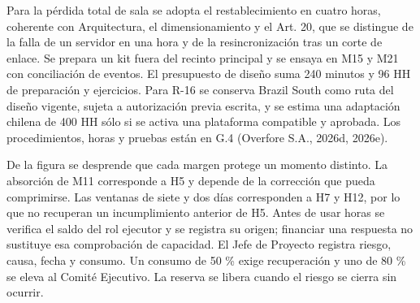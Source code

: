 \documentclass[subdoc]{../../comun/overfore}
\begin{document}
Para la pérdida total de sala se adopta el restablecimiento en cuatro horas, coherente con Arquitectura, el dimensionamiento y el Art. 20, que se distingue de la falla de un servidor en una hora y de la resincronización tras un corte de enlace. Se prepara un kit fuera del recinto principal y se ensaya en M15 y M21 con conciliación de eventos. El presupuesto de diseño suma 240 minutos y 96 HH de preparación y ejercicios. Para R-16 se conserva Brazil South como ruta del diseño vigente, sujeta a autorización previa escrita, y se estima una adaptación chilena de 400 HH sólo si se activa una plataforma compatible y aprobada. Los procedimientos, horas y pruebas están en G.4 (Overfore S.A., 2026d, 2026e).

De la figura se desprende que cada margen protege un momento distinto. La absorción de M11 corresponde a H5 y depende de la corrección que pueda comprimirse. Las ventanas de siete y dos días corresponden a H7 y H12, por lo que no recuperan un incumplimiento anterior de H5. Antes de usar horas se verifica el saldo del rol ejecutor y se registra su origen; financiar una respuesta no sustituye esa comprobación de capacidad. El Jefe de Proyecto registra riesgo, causa, fecha y consumo. Un consumo de 50 \% exige recuperación y uno de 80 \% se eleva al Comité Ejecutivo. La reserva se libera cuando el riesgo se cierra sin ocurrir.
\end{document}
